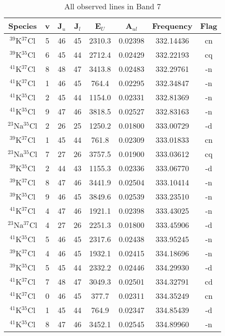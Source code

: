 \begin{table*}[htp]
\centering
\caption{All observed lines in Band 7}
\begin{tabular}{cccccccc}
\label{tab:all_detections_B7}
Species & v & J$_u$ & J$_l$ & E$_U$ & A$_{ul}$ & Frequency & Flag \\
\hline
$^{39}$K$^{37}$Cl & 5 & 46 & 45 & 2310.3 & 0.02398 & 332.14436 & cn \\
$^{39}$K$^{35}$Cl & 6 & 45 & 44 & 2712.4 & 0.02429 & 332.22193 & cq \\
$^{41}$K$^{37}$Cl & 8 & 48 & 47 & 3413.8 & 0.02483 & 332.29761 & -n \\
$^{41}$K$^{37}$Cl & 1 & 46 & 45 & 764.4 & 0.02295 & 332.34847 & -n \\
$^{41}$K$^{35}$Cl & 2 & 45 & 44 & 1154.0 & 0.02331 & 332.81369 & -n \\
$^{41}$K$^{35}$Cl & 9 & 47 & 46 & 3818.5 & 0.02527 & 332.83163 & -n \\
$^{23}$Na$^{35}$Cl & 2 & 26 & 25 & 1250.2 & 0.01800 & 333.00729 & -d \\
$^{39}$K$^{37}$Cl & 1 & 45 & 44 & 761.8 & 0.02309 & 333.01833 & cn \\
$^{23}$Na$^{35}$Cl & 7 & 27 & 26 & 3757.5 & 0.01900 & 333.03612 & cq \\
$^{39}$K$^{35}$Cl & 2 & 44 & 43 & 1155.3 & 0.02336 & 333.06770 & -d \\
$^{39}$K$^{37}$Cl & 8 & 47 & 46 & 3441.9 & 0.02504 & 333.10414 & -n \\
$^{39}$K$^{35}$Cl & 9 & 46 & 45 & 3849.6 & 0.02539 & 333.23510 & -n \\
$^{41}$K$^{37}$Cl & 4 & 47 & 46 & 1921.1 & 0.02398 & 333.43025 & -n \\
$^{23}$Na$^{37}$Cl & 4 & 27 & 26 & 2251.3 & 0.01800 & 333.45906 & -d \\
$^{41}$K$^{35}$Cl & 5 & 46 & 45 & 2317.6 & 0.02438 & 333.95245 & -n \\
$^{39}$K$^{37}$Cl & 4 & 46 & 45 & 1932.1 & 0.02415 & 334.18696 & -n \\
$^{39}$K$^{35}$Cl & 5 & 45 & 44 & 2332.2 & 0.02446 & 334.29930 & -d \\
$^{41}$K$^{37}$Cl & 7 & 48 & 47 & 3049.3 & 0.02501 & 334.32791 & cd \\
$^{41}$K$^{37}$Cl & 0 & 46 & 45 & 377.7 & 0.02311 & 334.35249 & cn \\
$^{41}$K$^{35}$Cl & 1 & 45 & 44 & 764.9 & 0.02347 & 334.85439 & -d \\
$^{41}$K$^{35}$Cl & 8 & 47 & 46 & 3452.1 & 0.02545 & 334.89960 & -n \\

\end{tabular}
\end{table*}
